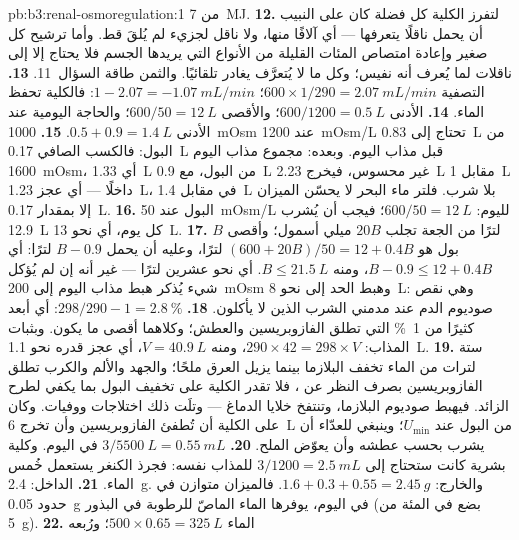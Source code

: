 \begin{solution}{pb:b3:renal-osmoregulation:1}
من \qty{7}{MJ}.
\textbf{12.} لتفرز الكلية كل فضلة كان على النبيب أن يحمل
ناقلًا يتعرفها --- أي آلافًا منها، ولا ناقل لجزيء لم يُلقَ
قط. وأما ترشيح كل صغير وإعادة امتصاص المئات القليلة من
الأنواع التي يريدها الجسم فلا يحتاج إلا إلى ناقلات لما
يُعرف أنه نفيس؛ وكل ما لا يُتعرَّف يغادر تلقائيًا. والثمن
طاقة السؤال~11.
\textbf{13.} التصفية  $600\times 1/290 = \qty{2.07}{mL/min}$؛
 $1 - 2.07 = -\qty{1.07}{mL/min}$: فالكلية تحفظ
الماء.
\textbf{14.} الأدنى $600/1200 = \qty{0.5}{L}$؛ والأقصى $600/50 =
\qty{12}{L}$؛ والحاجة اليومية عند الأدنى $0.5 + 0.9 = \qty{1.4}{L}$.
\textbf{15.} \qty{1000}{mOsm} عند \qty{1200}{mOsm/L} تحتاج إلى
\qty{0.83}{L} من البول: فالكسب الصافي \qty{0.17}{L} قبل مذاب اليوم.
وبعده: مجموع مذاب اليوم \qty{1600}{mOsm}، أي \qty{1.33}{L} من
البول، مع \qty{0.9}{L} غير محسوس، فيخرج \qty{2.23}{L} مقابل
\qty{1}{L} داخلًا --- أي عجز \qty{1.23}{L}، في مقابل
\qty{1.4}{L} بلا شرب. فلتر ماء البحر لا يحسّن الميزان إلا
بمقدار \qty{0.17}{L}.
\textbf{16.} البول عند \qty{50}{mOsm/L} لليوم: $600/50 =
\qty{12}{L}$؛ فيجب أن يُشرب \qty{12.9}{L} كل يوم، أي نحو \qty{13}{L}.
\textbf{17.} $B$ لترًا من الجعة تجلب $20B$ ميلي أسمول؛ وأقصى بول
هو $(600 + 20B)/50 = 12 + 0.4B$ لترًا، وعليه أن يحمل $B - 0.9$
لترًا: أي $B - 0.9 \le 12 + 0.4B$، ومنه $B \le \qty{21.5}{L}$. أي
نحو عشرين لترًا --- غير أنه إن لم يُؤكل شيء يُذكر هبط مذاب
اليوم إلى \qty{200}{mOsm} وهبط الحد إلى نحو \qty{8}{L}: وهي
نقص صوديوم الدم عند مدمني الشرب الذين لا يأكلون.
\textbf{18.} $298/290 - 1 = \qty{2.8}{\%}$: أي أبعد كثيرًا من
\qty{1}{\%} التي تطلق الفازوبريسين والعطش؛ وكلاهما أقصى ما
يكون. وبثبات المذاب: $290\times 42 = 298\times V$، ومنه
$V = \qty{40.9}{L}$، أي عجز قدره نحو \qty{1.1}{L}.
\textbf{19.} ستة لترات من الماء تخفف البلازما بينما يزيل العرق
ملحًا؛ والجهد والألم والكرب تطلق الفازوبريسين بصرف النظر عن
، فلا تقدر الكلية على تخفيف البول بما يكفي لطرح
الزائد. فيهبط صوديوم البلازما، وتنتفخ خلايا الدماغ ---
وتلَت ذلك اختلاجات ووفيات. وكان على الكلية أن تُطفئ
الفازوبريسين وأن تخرج \qty{6}{L} من البول عند $U_{\min}$؛
وينبغي للعدّاء أن يشرب بحسب عطشه وأن يعوّض الملح.
\textbf{20.} $3/5500\ \unit{L} = \qty{0.55}{mL}$ في اليوم. وكلية
بشرية كانت ستحتاج إلى $3/1200 = \qty{2.5}{mL}$ للمذاب نفسه:
فجرذ الكنغر يستعمل خُمس الماء.
\textbf{21.} الداخل: \qty{2.4}{g}. والخارج: $1.6 + 0.3 + 0.55 = \qty{2.45}{g}$.
فالميزان متوازن في حدود \qty{0.05}{g} في اليوم، يوفرها الماء
الماصّ للرطوبة في البذور (بضع في المئة من \qty{5}{g}).
\textbf{22.} الماء $500\times 0.65 = \qty{325}{L}$؛ ورُبعه

\end{solution}
